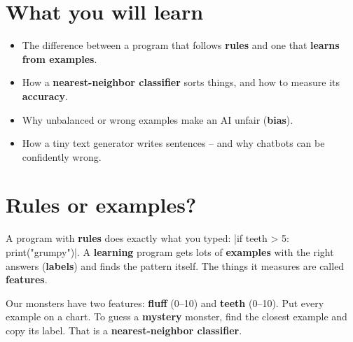 
\section{What you will learn}
\begin{itemize}[itemsep=1pt]
  \item The difference between a program that follows \textbf{rules} and one that \textbf{learns from examples}.
  \item How a \textbf{nearest-neighbor classifier} sorts things, and how to measure its \textbf{accuracy}.
  \item Why unbalanced or wrong examples make an AI unfair (\textbf{bias}).
  \item How a tiny text generator writes sentences -- and why chatbots can be confidently wrong.
\end{itemize}

\section{Rules or examples?}
A program with \textbf{rules} does exactly what you typed: \py|if teeth > 5: print("grumpy")|. A \textbf{learning} program gets lots of \textbf{examples} with the right answers (\textbf{labels}) and finds the pattern itself. The things it measures are called \textbf{features}.

Our monsters have two features: \textbf{fluff} (0--10) and \textbf{teeth} (0--10). Put every example on a chart. To guess a \textbf{mystery} monster, find the closest example and copy its label. That is a \textbf{nearest-neighbor classifier}.

